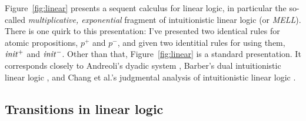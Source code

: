 

Figure~\ref{fig:linear} presents a sequent calculus for linear logic,
in particular the so-called {\it multiplicative, exponential} fragment
of intuitionistic linear logic (or {\it MELL}). There is one quirk to
this presentation: I've presented two identical rules for atomic
propositions, $p^+$ and $p^-$, and given two identitial rules for
using them, ${\it init}^+$ and ${\it init}^-$. Other than that,
Figure~\ref{fig:linear} is a standard presentation. It corresponds
closely to Andreoli's dyadic system \cite{andreoli92logic}, Barber's
dual intuitionistic linear logic \cite{barber96dual}, and Chang et
al.'s judgmental analysis of intuitionistic linear logic
\cite{chang03judgmental}.

\subsection*{Transitions in linear logic}

